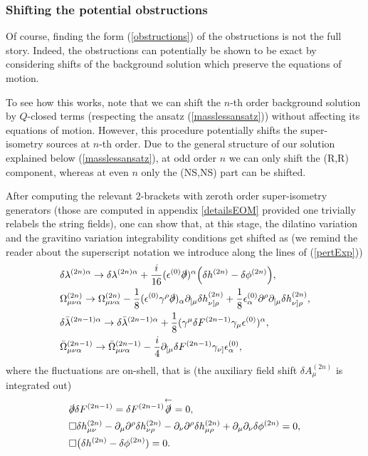 \documentclass[12pt]{article}
\def\be{\begin{equation}}
\def\ee{\end{equation}}
\numberwithin{equation}{section}
\begin{document}
\subsubsection{Shifting the potential obstructions}

Of course, finding the form (\ref{obstructions}) of the obstructions is not the full story. Indeed, the obstructions can potentially be shown to be exact by considering shifts of the background solution which preserve the equations of motion.


To see how this works, note that we can shift the $n$-th order background solution by $Q$-closed terms (respecting the ansatz (\ref{masslessansatz})) without affecting its equations of motion. However, this procedure potentially shifts the super-isometry sources at $n$-th order. Due to the general structure of our solution explained below (\ref{masslessansatz}),  at odd order $n$ we can only shift the (R,R) component, whereas at even $n$ only the (NS,NS) part can be shifted.

After computing the relevant 2-brackets with zeroth order super-isometry generators (those are computed in appendix \ref{detailsEOM} provided one trivially relabels the string fields), one can show that, at this stage, the dilatino variation and the gravitino variation integrability conditions get shifted as (we remind the reader about the superscript notation we introduce along the lines of (\ref{pertExp}))
\be
\begin{aligned}
&\delta \lambda^{(2n)\alpha} \to \delta \lambda^{(2n)\alpha} + \frac{i}{16}(\epsilon^{(0)}\slashed{\partial})^{\alpha}\Big(\delta h^{(2n)}-\delta \phi^{(2n)}\Big), \\
& \Omega^{(2n)}_{\mu \nu \alpha} \to \Omega^{(2n)}_{\mu \nu \alpha} -\frac{1}{8}(\epsilon^{(0)}\gamma^{\rho}\slashed{\partial})_{\alpha}\partial_{[\mu}\delta h^{(2n)}_{\nu]\rho}+\frac{1}{8}\epsilon^{(0)}_{\alpha}\partial^{\rho}\partial_{[\mu}\delta h^{(2n)}_{\nu]\rho}, \\
& \delta \bar{\lambda}^{(2n-1)\alpha} \to \delta \bar{\lambda}^{(2n-1)\alpha}  + \frac{1}{8}(\gamma^{\mu}\delta F^{(2n-1)}\gamma_{\mu}\epsilon^{(0)})^{\alpha}, \\
&\bar{\Omega}^{(2n-1)}_{\mu \nu \alpha} \to \bar{\Omega}^{(2n-1)}_{\mu \nu \alpha} - \frac{i}{4}\partial_{[\mu}\delta F^{(2n-1)}\gamma_{\nu]}{\epsilon}^{(0)}_{\alpha},
\end{aligned}
\ee
where the fluctuations are on-shell, that is (the auxiliary field shift $\delta A_\mu^{(2n)}$ is integrated out)
\be
\begin{aligned}
    &\slashed{\partial} \delta F^{(2n-1)} = \delta F^{(2n-1)}  \overset{\leftarrow}{\slashed{\partial}} = 0, \\
    &\Box \delta h^{(2n)}_{\mu\nu} - \partial_\mu \partial^\rho \delta h_{\nu \rho}^{(2n)} - \partial_\nu \partial^\rho \delta h_{\mu \rho}^{(2n)} +  \partial_\mu \partial_\nu \delta \phi^{(2n)} = 0, \\
    &\Box\big(\delta h^{(2n)} - \delta \phi^{(2n)}) = 0.
\end{aligned}
\ee
\end{document}
